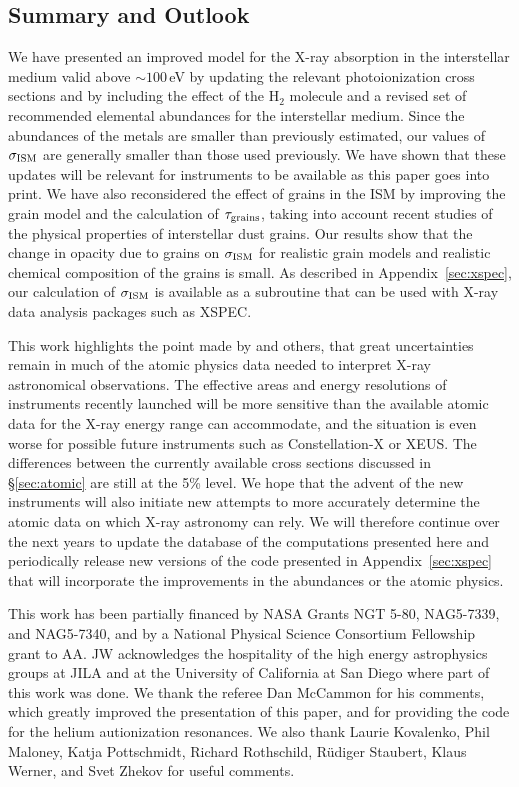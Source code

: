 \documentclass{aastex}
\newcommand{\sigism}{\ensuremath{\sigma_{\rm ISM}}}
\begin{document}
\subsection{Summary and Outlook}
We have presented an improved model for the X-ray absorption in the
interstellar medium valid above $\sim 100$\,eV by updating the
relevant photoionization cross sections and by including the effect of
the H$_2$ molecule and a revised set of recommended elemental
abundances for the interstellar medium.  Since the abundances of the
metals are smaller than previously estimated, our values of $\sigism$
are generally smaller than those used previously. We have shown that
these updates will be relevant for instruments to be available as this
paper goes into print.  We have also reconsidered the effect of grains
in the ISM by improving the grain model and the calculation of
$\tau_{\rm grains}$, taking into account recent studies of the
physical properties of interstellar dust grains. Our results show that
the change in opacity due to grains on $\sigism$ for realistic grain
models and realistic chemical composition of the grains is small. As
described in Appendix~\ref{sec:xspec}, our calculation of $\sigism$ is
available as a subroutine that can be used with X-ray data analysis
packages such as XSPEC.

This work highlights the point made by \citet{shull:93a} and others,
that great uncertainties remain in much of the atomic physics data
needed to interpret X-ray astronomical observations.  The effective
areas and energy resolutions of instruments recently 
launched will be more sensitive than the available atomic data for the
X-ray energy range can accommodate, and the situation is even worse
for possible future instruments such as Constellation-X or XEUS.  The
differences between the currently available cross sections discussed
in \S\ref{sec:atomic} are still at the 5\% level.  We hope that the
advent of the new instruments will also initiate new attempts to more
accurately determine the atomic data on which X-ray astronomy can
rely. We will therefore continue over the next years to update the
database of the computations presented here and periodically release
new versions of the code presented in Appendix~\ref{sec:xspec} that
will incorporate the improvements in the abundances or the atomic
physics.


\acknowledgements This work has been partially financed by NASA Grants
NGT 5-80, NAG5-7339, and NAG5-7340, and by a National Physical Science
Consortium Fellowship grant to AA.  JW acknowledges the hospitality of
the high energy astrophysics groups at JILA and at the University of
California at San Diego where part of this work was done. We thank the 
referee Dan McCammon for his comments, which greatly improved the 
presentation of this paper, and for providing the code for the helium 
autionization resonances.  We also thank Laurie Kovalenko, Phil Maloney,
Katja Pottschmidt, Richard Rothschild, R\"udiger Staubert, Klaus Werner, 
and Svet Zhekov for useful comments.
% 
\end{document}
